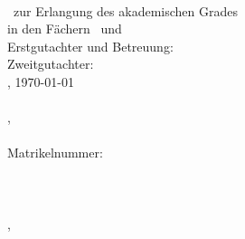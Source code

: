 \hfill
\vfill
{
	\small
	\textbf{\thesisTitle} \\
	\thesisSubject\ zur Erlangung des akademischen Grades \textit{\thesisDegree} \\
	in den Fächern \thesisAuthorFirstSubject\ und \thesisAuthorSecondSubject \\
	Erstgutachter und Betreuung: \thesisFirstReviewer \\
	Zweitgutachter: \thesisSecondReviewer \\
	\thesisAuthorCity, \today \\[1.5em]	
	\textbf{\thesisName} \\
	\thesisAuthorStreet, \thesisAuthorPostalCode\ \thesisAuthorCity \\
	\texttt{\thesisAuthorMail} \\
	Matrikelnummer: \thesisAuthorId \\[1.5em]
	\textbf{\thesisUniversity} \\
	\thesisUniversityDepartment \\
	\thesisUniversityInstitute \\
	\thesisUniversityStreetAddress, \thesisUniversityPostalCode\ \thesisUniversityCity
}
